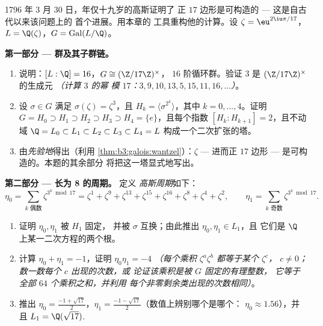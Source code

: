 \begin{problem}\label{pb:b3:galois:1}
1796 年 3 月 30 日，年仅十九岁的高斯证明了
正 $17$ 边形是可构造的 --- 这是自古代以来该问题上的
首个进展。用本章的
工具重构他的计算。设 $\zeta = \eu^{2\iu\pi/17}$，$L =
\Q(\zeta)$，$G = \operatorname{Gal}(L/\Q)$。

\medskip
\noindent\textbf{第一部分 --- 群及其子群链。}
\begin{enumerate}
  \item 说明：$[L:\Q] = 16$，$G \cong (\Z/17\Z)^\times$，
        $16$ 阶循环群。验证 $3$ 是
        $(\Z/17\Z)^\times$ 的生成元 \emph{（计算 $3$ 的幂
        模 $17$：$3, 9, 10, 13, 5, 15, 11, 16, \dots$）}。
  \item 设 $\sigma \in G$ 满足 $\sigma(\zeta) = \zeta^3$，且
        $H_k = \langle \sigma^{2^k}\rangle$，其中 $k = 0, \dots,
        4$。证明 $G = H_0 \supset H_1 \supset H_2 \supset
        H_3 \supset H_4 = \{e\}$，且每个指数 $[H_k :
        H_{k+1}] = 2$，且不动域 $\Q = L_0
        \subset L_1 \subset L_2 \subset L_3 \subset L_4 = L$
        构成一个二次扩张的塔。
  \item 由\emph{先验地}得出（利用
        \cref{thm:b3:galois:wantzel}）：$\zeta$ --- 进而正
        $17$ 边形 --- 是可构造的。本题的其余部分
        将把这一塔显式地写出。
\end{enumerate}

\medskip
\noindent\textbf{第二部分 --- 长为 8 的周期。}
定义 \emph{高斯周期}如下：
\[
\eta_0 = \sum_{k \text{ 偶数}} \zeta^{3^k \bmod 17}
= \zeta^{1} + \zeta^{9} + \zeta^{13} + \zeta^{15} + \zeta^{16} +
\zeta^{8} + \zeta^{4} + \zeta^{2},
\qquad
\eta_1 = \sum_{k \text{ 奇数}} \zeta^{3^k \bmod 17}.
\]
\begin{enumerate}[resume]
  \item 证明 $\eta_0, \eta_1$ 被 $H_1$ 固定，
        并被 $\sigma$ 互换；由此推出 $\eta_0, \eta_1 \in L_1$，且
        它们是 $\Q$ 上某一二次方程的两个根。
  \item 计算 $\eta_0 + \eta_1 = -1$，证明 $\eta_0\eta_1 = -4$
        \emph{（每个乘积 $\zeta^a\zeta^b$ 都等于某个 $\zeta^c$，
        $c \neq 0$；数一数每个 $c$ 出现的次数，或
        论证该乘积是被 $G$ 固定的有理整数，
        它等于全部 $64$ 个乘积之和，并利用
        每个非零剩余类出现的次数相同）}。
  \item 推出 $\eta_0 = \frac{-1 + \sqrt{17}}2$，$\eta_1 =
        \frac{-1-\sqrt{17}}2$（数值上辨别哪个是哪个：
        $\eta_0 \approx 1.56$），并且 $L_1 =
        \Q(\sqrt{17})$.
\end{enumerate}


\end{problem}
